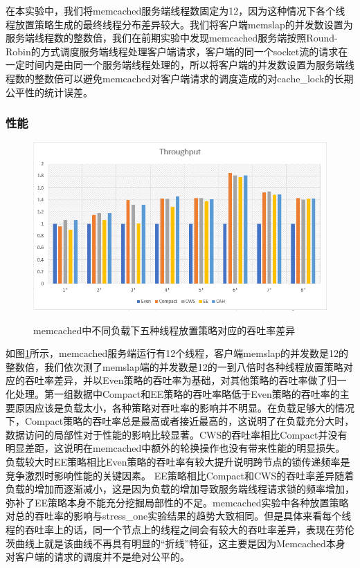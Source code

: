 在本实验中，我们将memcached服务端线程数固定为12，因为这种情况下各个线程放置策略生成的最终线程分布差异较大。我们将客户端memslap的并发数设置为服务端线程数的整数倍，我们在前期实验中发现memcached服务端按照Round-Robin的方式调度服务端线程处理客户端请求，客户端的同一个socket流的请求在一定时间内是由同一个服务端线程处理的，所以将客户端的并发数设置为服务端线程数的整数倍可以避免memcached对客户端请求的调度造成的对cache\_lock的长期公平性的统计误差。
\subsubsection{性能}

\begin{figure}[t]
	\centering
	\includegraphics[width=5.6in]{figure/memcached-throughput.PNG}
	\caption{memcached中不同负载下五种线程放置策略对应的吞吐率差异}{}
	\label{Fig:memcached-thrpt}
\end{figure}
如图\ref{Fig:memcached-thrpt}所示，memcached服务端运行有12个线程，客户端memslap的并发数是12的整数倍，我们依次测了memslap端的并发数是12的一到八倍时各种线程放置策略对应的吞吐率差异，并以Even策略的吞吐率为基础，对其他策略的吞吐率做了归一化处理。第一组数据中Compact和EE策略的吞吐率略低于Even策略的吞吐率的主要原因应该是负载太小，各种策略对吞吐率的影响并不明显。在负载足够大的情况下，Compact策略的吞吐率总是最高或者接近最高的，这说明了在负载充分大时，数据访问的局部性对于性能的影响比较显著。CWS的吞吐率相比Compact并没有明显差距，这说明在memcached中额外的轮换操作也没有带来性能的明显损失。负载较大时EE策略相比Even策略的吞吐率有较大提升说明跨节点的锁传递频率是竞争激烈时影响性能的关键因素。 EE策略相比Compact和CWS的吞吐率差异随着负载的增加而逐渐减小，这是因为负载的增加导致服务端线程请求锁的频率增加，弥补了EE策略本身不能充分挖掘局部性的不足。memcached实验中各种放置策略对总的吞吐率的影响与stress\_one实验结果的趋势大致相同。但是具体来看每个线程的吞吐率上的话，同一个节点上的线程之间会有较大的吞吐率差异，表现在劳伦茨曲线上就是该曲线不再具有明显的“折线”特征，这主要是因为Memcached本身对客户端的请求的调度并不是绝对公平的。
